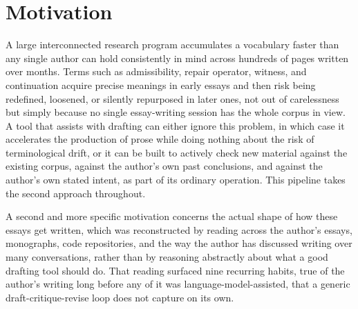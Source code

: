 \documentclass[11pt]{article}
\theoremstyle{definition}
\begin{document}
\begin{abstract}
checks explicitly for a named invariant; a witness-finding stage that
constructs concrete instances of the draft's abstract structure only
after that structure is finished; and a fidelity audit against the
original distinction. A persistent ledger and a persistent critique log
externalize memory across runs, and a companion driver script accretes
a small graph of chapters by recursively processing whatever
dependencies a given chapter discovers it needs. Four of the nine
stages were derived by taking vocabulary from the Phoenix Protocol, a
wave-interference memory architecture under separate audit, and
stripping it of its physical claims, keeping only whatever functioned
as a legitimate control pattern for an iterative language-model loop.
One genuine implementation bug, found through testing, is documented as
an incident report rather than silently fixed, since the failure mode
it represents --- an identity mechanism that collapses under
composition --- is exactly the kind of thing this system exists to
catch in prose, and very nearly failed to catch in its own source.
\end{abstract}

\section{Motivation}

A large interconnected research program accumulates a vocabulary faster
than any single author can hold consistently in mind across hundreds of
pages written over months. Terms such as admissibility, repair
operator, witness, and continuation acquire precise meanings in early
essays and then risk being redefined, loosened, or silently repurposed
in later ones, not out of carelessness but simply because no single
essay-writing session has the whole corpus in view. A tool that assists
with drafting can either ignore this problem, in which case it
accelerates the production of prose while doing nothing about the risk
of terminological drift, or it can be built to actively check new
material against the existing corpus, against the author's own past
conclusions, and against the author's own stated intent, as part of its
ordinary operation. This pipeline takes the second approach throughout.

A second and more specific motivation concerns the actual shape of how
these essays get written, which was reconstructed by reading across the
author's essays, monographs, code repositories, and the way the author
has discussed writing over many conversations, rather than by reasoning
abstractly about what a good drafting tool should do. That reading
surfaced nine recurring habits, true of the author's writing long
before any of it was language-model-assisted, that a generic
draft-critique-revise loop does not capture on its own.
\end{document}
